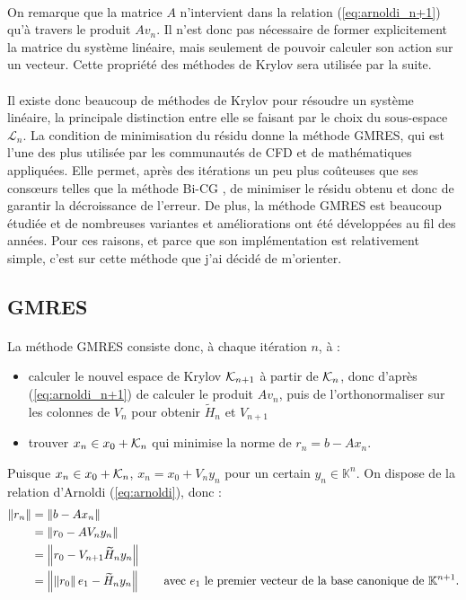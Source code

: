 		\paragraph{}
		On remarque que la matrice $A$ n'intervient dans la relation (\ref{eq:arnoldi_n+1}) qu'à travers le produit $Av_n$.
		Il n'est donc pas nécessaire de former explicitement la matrice du système linéaire, mais seulement de pouvoir calculer son action sur un vecteur.
		Cette propriété des méthodes de Krylov sera utilisée par la suite.

		\paragraph{}
		Il existe donc beaucoup de méthodes de Krylov pour résoudre un système linéaire, la principale distinction entre elle se faisant par le choix du sous-espace $\mathcal{L}_n$.
		La condition de minimisation du résidu donne la méthode GMRES, qui est l'une des plus utilisée par les communautés de CFD et de mathématiques appliquées.
		Elle permet, après des itérations un peu plus coûteuses que ses consœurs telles que la méthode Bi-CG \cite{TrefethenBau1997}, de minimiser le résidu obtenu et donc de garantir la décroissance de l'erreur.
		De plus, la méthode GMRES est beaucoup étudiée et de nombreuses variantes et améliorations ont été développées au fil des années.
		Pour ces raisons, et parce que son implémentation est relativement simple, c'est sur cette méthode que j'ai décidé de m'orienter.


	\subsection{GMRES}

		\paragraph{}
		La méthode GMRES \cite{SaadSchultz1986} consiste donc, à chaque itération $n$, à :
		\begin{itemize}
			\item calculer le nouvel espace de Krylov $\krylov{n+1}$ à partir de $\krylov{n}$, donc d'après (\ref{eq:arnoldi_n+1}) de calculer le produit $Av_n$, puis de l'orthonormaliser sur les colonnes de $V_n$ pour obtenir $\widetilde{H}_n$ et $V_{n+1}$
			\item trouver $x_n \in x_0 + \krylov{n}$ qui minimise la norme de $r_n = b - Ax_n$.
		\end{itemize}
		Puisque $x_n \in x_0 + \krylov{n}$, $x_n = x_0 + V_n y_n$ pour un certain $y_n\in\mathbb{K}^n$.
		On dispose de la relation d'Arnoldi (\ref{eq:arnoldi}), donc :
		\begin{align*}
			\norm{r_n} &= \norm{b - Ax_n} \\
			&= \norm{r_0 - AV_ny_n} \\
			&= \norm{r_0 - V_{n+1}\widetilde{H}_ny_n} \\
			&= \norm{\norm{r_0} e_1 - \widetilde{H}_ny_n}\qquad\textrm{avec $e_1$ le premier vecteur de la base canonique de $\mathbb{K}^{n+1}$.}
		\end{align*}

